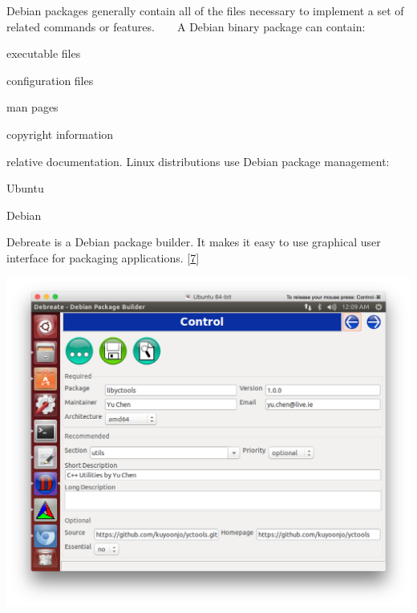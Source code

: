 Debian packages generally contain all of the files necessary to implement a set of related commands or features. ~\newline
~\newline
A Debian binary package can contain\+:
\begin{DoxyItemize}
\item executable files
\item configuration files
\item man pages
\item copyright information
\item relative documentation. Linux distributions use Debian package management\+:
\item Ubuntu
\item Debian
\end{DoxyItemize}

Debreate is a Debian package builder. It makes it easy to use graphical user interface for packaging applications. \mbox{[}\hyperlink{_reference_r7}{7}\mbox{]} 
\begin{DoxyImageNoCaption}
  \mbox{\includegraphics[width=\textwidth,height=\textheight/2,keepaspectratio=true]{ResearchDebreate.png}}
\end{DoxyImageNoCaption}
 